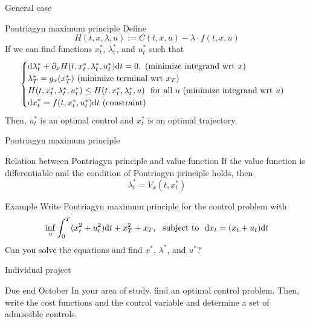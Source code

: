 \documentclass[color=usenames,dvipsnames]{beamer}
\newcommand{\dd}{\text{\normalfont d}}
\newcommand{\dt}{\text{\normalfont d}t}
\newcommand{\dx}{\text{\normalfont d}x}
\begin{document}
\begin{frame}{General case}
    \begin{block}
        {Pontriagyn maximum principle}
        Define
        \[
        H(t,x,\lambda,u) := C(t,x,u)-\lambda\cdot f(t,x,u)
        \]
        If we can find functions $x^*_t$, $\lambda^*_t$, and $u^*_t$ such that 
    \[
    \begin{cases}
        {\dd}\lambda^*_t+ \partial_x H(t,x^*_t,\lambda^*_t,u^*_t){{\dt}}=0,~(\textrm{minimize integrand wrt $x$})\\
        \lambda^*_T=g_x(x_T^*) ~(\textrm{minimize terminal wrt $x_T$})\\
        H(t,x^*_t,\lambda^*_t,u^*_t)\le H(t,x^*_t,\lambda^*_t,u)~\textrm{ for all } u ~(\textrm{minimize integrand wrt $u$})\\
        {\dx}^*_t = f(t,x^*_t,u^*_t) {{\dt}} ~(\textrm{constraint})
        \end{cases}
    \]
    Then, $u^*_t$ is an optimal control and $x^*_t$ is an optimal trajectory.
    \end{block}
\end{frame}
\begin{frame}{Pontriagyn maximum principle}

\begin{block}
    {Relation between Pontriagyn principle and value function}
    If the value function is differentiable and the condition of Pontriagyn principle holds, then
    \[
    \lambda^*_t=V_x(t,x^*_t)
    \]
\end{block}
\begin{block}
    {Example}
    Write Pontriagyn maximum principle for the control problem with 
    \[
     \inf_{u}\int_0^T(x_t^2 + u_t^2 ){{\dt}} + x^2_T + x_T,~\text{ subject to  }~{\dx}_t=( x_t +  u_t){{\dt}}
    \]
    Can you solve the equations and find $x^*$, $\lambda^*$, and $u^*$?
\end{block}
    
\end{frame}
\begin{frame}{Individual project}
\begin{block}{Due end October}
     In your area of study, find an optimal control problem. Then, write the cost functions and the control variable and determine a set of admissible controls. 
\end{block}
\end{frame}
\end{document}
